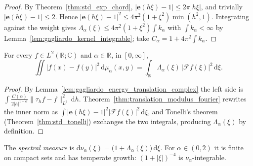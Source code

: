 \begin{proof}
\leanok
By Theorem~\ref{thm:std_exp_chord}, $\lvert \mathbf{e}(h \xi) - 1 \rvert \le 2\pi \lvert h \xi \rvert$, and trivially $\lvert \mathbf{e}(h \xi) - 1 \rvert \le 2$. Hence $\lvert \mathbf{e}(h \xi) - 1 \rvert^2 \le 4\pi^2 (1 + \xi^2) \min(h^2, 1)$. Integrating against the weight gives $\Lambda_\alpha(\xi) \le 4\pi^2 (1 + \xi^2) \int k_\alpha$ with $\int k_\alpha < \infty$ by Lemma~\ref{lem:gagliardo_kernel_integrable}; take $C_\alpha = 1 + 4\pi^2 \int k_\alpha$.
\end{proof}

\begin{theorem}\label{thm:gagliardo_energy_fourier}
\leanok
For every $f \in L^2(\mathbb{R}; \mathbb{C})$ and $\alpha \in \mathbb{R}$, in $[0, \infty]$,
\[
  \iint \lvert f(x) - f(y) \rvert^2 \, \mathrm{d}\mu_\alpha(x, y) = \int_{\mathbb{R}} \Lambda_\alpha(\xi)\, \lvert \mathcal{F} f(\xi) \rvert^2 \, \mathrm{d}\xi.
\]
\end{theorem}

\begin{proof}
\leanok
By Lemma~\ref{lem:gagliardo_energy_translation_complex} the left side is $\int \frac{C(\alpha)}{2\lvert h \rvert^{1+\alpha}} \lVert \tau_h f - f \rVert_{L^2}^2 \, \mathrm{d}h$. Theorem~\ref{thm:translation_modulus_fourier} rewrites the inner norm as $\int \lvert \mathbf{e}(h\xi) - 1 \rvert^2 \lvert \mathcal{F}f(\xi) \rvert^2 \, \mathrm{d}\xi$, and Tonelli's theorem (Theorem~\ref{thm:std_tonelli}) exchanges the two integrals, producing $\Lambda_\alpha(\xi)$ by definition.
\end{proof}

\begin{definition}\label{def:gagliardo_spectral_measure}
\leanok
The \emph{spectral measure} is $\mathrm{d}\nu_\alpha(\xi) = \bigl(1 + \Lambda_\alpha(\xi)\bigr)\, \mathrm{d}\xi$. For $\alpha \in (0, 2)$ it is finite on compact sets and has temperate growth: $(1 + \lvert \xi \rvert)^{-4}$ is $\nu_\alpha$-integrable.
\end{definition}

